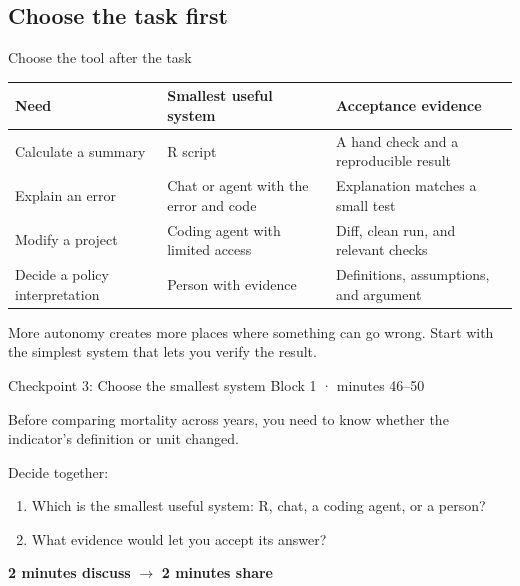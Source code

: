 \subsection{Choose the task first}

\begin{frame}{Choose the tool after the task}
  \small
  \begin{tabularx}{\textwidth}{@{}p{4.0cm}p{4.2cm}X@{}}
    \toprule
    Need & Smallest useful system & Acceptance evidence \\
    \midrule
    Calculate a summary & R script & A hand check and a reproducible result \\
    Explain an error & Chat or agent with the error and code & Explanation matches a small test \\
    Modify a project & Coding agent with limited access & Diff, clean run, and relevant checks \\
    Decide a policy interpretation & Person with evidence & Definitions, assumptions, and argument \\
    \bottomrule
  \end{tabularx}

  \vfill
  More autonomy creates more places where something can go wrong. Start with the
  simplest system that lets you verify the result.
\end{frame}

\begin{frame}{Checkpoint 3: Choose the smallest system}
  \alert{Block 1 · minutes 46--50}

  \vspace{0.55em}
  Before comparing mortality across years, you need to know whether the
  indicator's definition or unit changed.

  \vspace{0.55em}
  Decide together:
  \begin{enumerate}
    \item Which is the smallest useful system: R, chat, a coding agent, or a person?
    \item What evidence would let you accept its answer?
  \end{enumerate}

  \vfill
  \begin{center}
    \textbf{2 minutes discuss} \hspace{2.0em} $\longrightarrow$ \hspace{2.0em}
    \textbf{2 minutes share}
  \end{center}
\end{frame}
